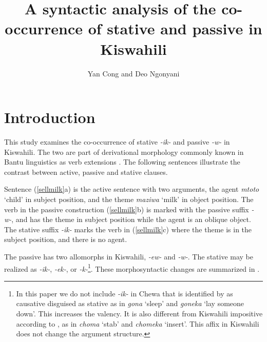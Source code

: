 \documentclass[output=paper]{langscibook}
\author{Yan Cong\affiliation{Michigan State University} and Deo Ngonyani\affiliation{Michigan State University}}
\title{A syntactic analysis of the co-occurrence of stative and passive in Kiswahili}
\begin{document}
\maketitle

\section{Introduction}
This study examines the co-occurrence of stative \textit{-ik-} and passive \textit{-w-} in Kiswahili. The two are part of derivational morphology commonly known in Bantu linguistics as verb extensions \citep{Guthrie1962a}. The following sentences illustrate the contrast between active, passive and stative clauses.  


 \begin{exe}
    \ex\label{sellmilk}{
    \begin{xlist}
    \end{xlist}}
\end{exe}

Sentence (\ref{sellmilk}a) is the active sentence with two arguments, the agent \textit{mtoto} `child' in subject position, and the theme \textit{maziwa} `milk' in object position. The verb in the passive construction (\ref{sellmilk}b) is marked with the passive suffix \textit{-w-}, and has the theme in subject position while the agent is an oblique object. The stative suffix \textit{-ik-} marks the verb in (\ref{sellmilk}c) where the theme is in the subject position, and there is no agent. 

The passive has two allomorphs in Kiswahili, \textit{-ew-} and \textit{-w-}. The stative may be realized as \textit{-ik-}, \textit{-ek-}, or \textit{-k-}\footnote{In this paper we do not include \textit{-ik-} in Chewa that is identified by \citet{Simango:2009aa} as causative disguised as stative as in \textit{gona} `sleep' and \textit{goneka} `lay someone down'. This increases the valency. It is also different from Kiswahili impositive according to \citet{8603069}, as in \textit{choma} `stab' and \textit{chomeka} `insert'. This affix in Kiswahili does not change the argument structure.}. These morphosyntactic changes are summarized in .\largerpage
\end{document}
